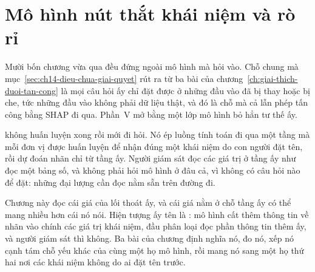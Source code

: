 %
%
\chapter{Mô hình nút thắt khái niệm và rò rỉ}
\label{ch:nut-that-khai-niem}

Mười bốn chương vừa qua đều đứng ngoài mô hình mà hỏi vào. Chỗ chung mà
mục~\ref{sec:ch14-dieu-chua-giai-quyet} rút ra từ ba bài của
chương~\ref{ch:giai-thich-duoi-tan-cong} là mọi câu hỏi ấy chỉ đặt được ở những
đầu vào đã bị thay hoặc bị che, tức những đầu vào không phải dữ liệu thật, và
đó là chỗ mà cả  lẫn phép tấn công bằng SHAP đi
qua. Phần~V mở bằng một lớp mô hình bỏ hẳn tư thế ấy.

 không huấn luyện xong
rồi mới đi hỏi. Nó ép luồng tính toán đi qua một tầng mà mỗi đơn vị được huấn
luyện để nhận đúng một khái niệm do con người đặt tên, rồi dự đoán nhãn chỉ từ
tầng ấy. Người giám sát đọc các giá trị ở tầng ấy như đọc một bảng số, và không
phải hỏi mô hình ở đâu cả, vì không có câu hỏi nào để đặt: những đại lượng cần
đọc nằm sẵn trên đường đi.

Chương này đọc cái giá của lối thoát ấy, và cái giá nằm ở chỗ tầng ấy có thể
mang nhiều hơn cái nó nói. Hiện tượng ấy tên là : mô hình cất
thêm thông tin về nhãn vào chính các giá trị khái niệm, đầu phân loại đọc phần
thông tin thêm ấy, và người giám sát thì không. Ba bài của chương định nghĩa nó,
đo nó, xếp nó cạnh tám chỗ yếu khác của cùng một họ mô hình, rồi mang nó sang
một họ thứ hai nơi các khái niệm không do ai đặt tên trước.

